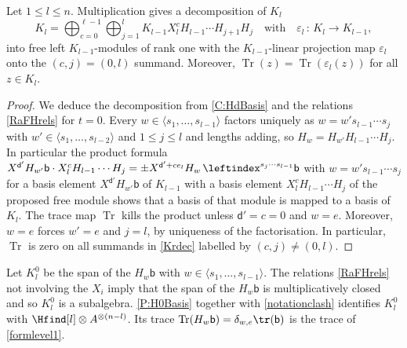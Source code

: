 \documentclass[a4paper,11pt]{amsart}
\def\map#1#2{\,{:}\,#1\!\longrightarrow\!#2}
\newcommand{\Tr}{\op{Tr}}
\numberwithin{equation}{subsection}
\theoremstyle{definition}
\theoremstyle{theorem}
\theoremstyle{remark}
\newcommand\tl{l}
\newcommand\Kr[1]{K_{#1}}
\newcommand\Kz[1]{K^{0}_{#1}}
\newcommand\bd{\mathsf{d}}
\newcommand\bb{\mathsf{b}}
\newcommand\op{\operatorname}
\begin{document}
    \begin{Lemma}\label{L:Krdec}
   Let $1\leq \tl\leq n$. Multiplication gives a decomposition of $\Kr{\tl}$
      \begin{equation}\label{Krdec}
    \Kr{\tl}=\bigoplus_{c=0}^{\ell-1}\bigoplus_{j=1}^{\tl}\Kr{\tl-1}X_{\tl}^{c}H_{\tl-1}\cdots H_{j+1}H_j \quad\text{with}\quad \varepsilon_{\tl}\map{\Kr{\tl}}{\Kr{\tl-1}},
    \end{equation}
     into free left $\Kr{\tl-1}$-modules of rank one  with  the $\Kr{\tl-1}$-linear projection map $\varepsilon_{\tl}$ onto the $(c,j)=(0,\tl)$ summand. Moreover, $\Tr(z)=\Tr(\varepsilon_{\tl}(z))$ for all $z\in\Kr{\tl}$.
 \end{Lemma}
 \begin{proof}We deduce the decomposition from \autoref{C:HdBasis} and the relations \autoref{RaFHrels} for $t=0$. Every $w\in\langle s_1,\dots,s_{\tl-1}\rangle$ factors uniquely as $w=w's_{\tl-1}\cdots s_j$ with $w'\in\langle s_1,\dots,s_{\tl-2}\rangle$ and $1\leq j\leq\tl$ and  lengths adding, so $H_w=H_{w'}H_{\tl-1}\cdots H_j$. In particular the  product formula $X^{\bd'}H_{w'}\bb\cdot X_{\tl}^{c}H_{\tl-1}\cdots H_j=\pm X^{\bd'+ce_{\tl}}H_{w}\,\leftindex^{s_j\cdots s_{\tl-1}}\bb$ with $w=w's_{\tl-1}\cdots s_j$  for a basis element $X^{\bd'}H_{w'}\bb$ of $\Kr{\tl-1}$ with a basis element $X_{\tl}^{c}H_{\tl-1}\cdots H_j$ of the proposed free module shows that a basis of that module is mapped to a basis of $\Kr{\tl}$. The trace map $\Tr$ kills the product unless $\bd'=c=0$ and $w=e$. Moreover, $w=e$ forces $w'=e$ and $j=\tl$, by uniqueness of the factorisation. In particular,  $\Tr$  is zero on all summands in \autoref{Krdec} labelled by $(c,j)\not=(0,\tl)$.
\end{proof}

Let $\Kz{\tl}$ be the span of the $H_w\bb$ with $w\in\langle s_1,\dots,s_{\tl-1}\rangle$. The relations \autoref{RaFHrels} not involving the $X_i$ imply that the span of the $H_w\bb$ is multiplicatively closed and so $\Kz{\tl}$ is a subalgebra. \autoref{P:H0Basis} together with \autoref{notationclash} identifies $\Kz{\tl}$ with $\Hfind[\tl]\otimes A^{\otimes(n-\tl)}$. Its trace  $\Tr(H_w\bb)=\delta_{w,e}\tr(\bb)$ is the trace of \autoref{formlevel1}.
\end{document}
